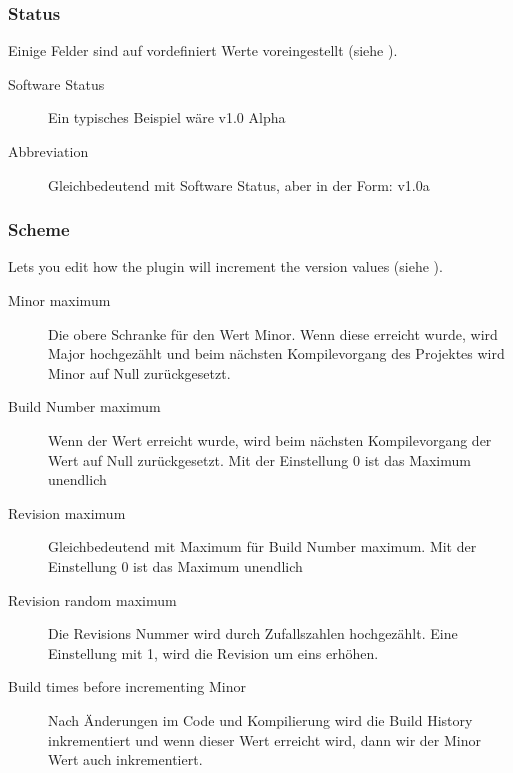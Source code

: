 
\subsubsection{Status}

Einige Felder sind auf vordefiniert Werte voreingestellt (siehe ).

\begin{description}
\item[Software Status] Ein typisches Beispiel wäre v1.0 Alpha
\item[Abbreviation] Gleichbedeutend mit Software Status, aber in der Form: v1.0a
\end{description}


\subsubsection{Scheme}

Lets you edit how the plugin will increment the version values (siehe ).


\begin{description}
\item[Minor maximum] Die obere Schranke für den Wert Minor. Wenn diese erreicht wurde, wird Major hochgezählt und beim nächsten Kompilevorgang des Projektes wird Minor auf Null zurückgesetzt.
\item[Build Number maximum] Wenn der Wert erreicht wurde, wird beim nächsten Kompilevorgang der Wert auf Null zurückgesetzt. Mit der Einstellung 0 ist das Maximum unendlich
\item[Revision maximum] Gleichbedeutend mit Maximum für Build Number maximum. Mit der Einstellung 0 ist das Maximum unendlich
\item[Revision random maximum] Die Revisions Nummer wird durch Zufallszahlen hochgezählt. Eine Einstellung mit 1, wird die Revision um eins erhöhen.
\item[Build times before incrementing Minor] Nach Änderungen im Code und Kompilierung wird die Build History inkrementiert und wenn dieser Wert erreicht wird, dann wir der Minor Wert auch inkrementiert.
\end{description}

